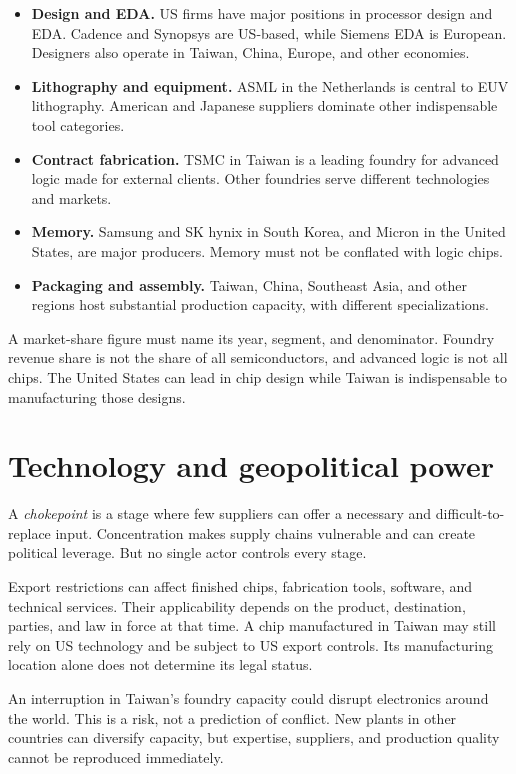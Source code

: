 \begin{itemize}
\item {\bf Design and EDA.}
US firms have major positions in
processor design and EDA. Cadence
and Synopsys are US-based, while
Siemens EDA is European. Designers
also operate in Taiwan, China,
Europe, and other economies.
\item {\bf Lithography and equipment.}
ASML in the Netherlands is central
to EUV lithography. American and
Japanese suppliers dominate
other indispensable tool categories.
\item {\bf Contract fabrication.}
TSMC in Taiwan is a leading foundry
for advanced logic made for external
clients. Other foundries serve
different technologies and markets.
\item {\bf Memory.}
Samsung and SK hynix in South Korea,
and Micron in the United States,
are major producers. Memory must
not be conflated with logic chips.
\item {\bf Packaging and assembly.}
Taiwan, China, Southeast Asia,
and other regions host substantial
production capacity, with
different specializations.
\end{itemize}

A market-share figure must name its
year, segment, and denominator.
Foundry revenue share is not the
share of all semiconductors, and
advanced logic is not all chips.
The United States can lead in chip
design while Taiwan is indispensable
to manufacturing those designs.

\section{Technology and geopolitical power}

A {\it chokepoint} is a stage where
few suppliers can offer a necessary
and difficult-to-replace input.
Concentration makes supply chains
vulnerable and can create political
leverage. But no single actor
controls every stage.

Export restrictions can affect
finished chips, fabrication tools,
software, and technical services.
Their applicability depends on
the product, destination, parties,
and law in force at that time.
A chip manufactured in Taiwan may
still rely on US technology and
be subject to US export controls.
Its manufacturing location alone
does not determine its legal status.

An interruption in Taiwan's foundry
capacity could disrupt electronics
around the world. This is a risk,
not a prediction of conflict.
New plants in other countries can
diversify capacity, but expertise,
suppliers, and production quality
cannot be reproduced immediately.

